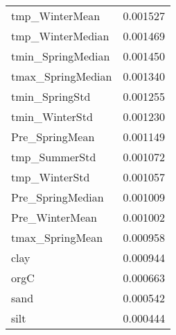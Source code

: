 \begin{tabular}{lr}
tmp_WinterMean & 0.001527 \\
tmp_WinterMedian & 0.001469 \\
tmin_SpringMedian & 0.001450 \\
tmax_SpringMedian & 0.001340 \\
tmin_SpringStd & 0.001255 \\
tmin_WinterStd & 0.001230 \\
Pre_SpringMean & 0.001149 \\
tmp_SummerStd & 0.001072 \\
tmp_WinterStd & 0.001057 \\
Pre_SpringMedian & 0.001009 \\
Pre_WinterMean & 0.001002 \\
tmax_SpringMean & 0.000958 \\
clay & 0.000944 \\
orgC & 0.000663 \\
sand & 0.000542 \\
silt & 0.000444 \\
\bottomrule
\end{tabular}
